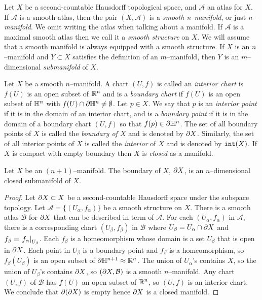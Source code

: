 \begin{defn}[Manifolds]
	\label{def:manifold}
	Let $X$ be a second-countable Hausdorff topological space, and $\mathcal{A}$ an atlas for $X$.
	If $\mathcal{A}$ is a smooth atlas, then the pair $(X,\mathcal{A})$ is a \emph{smooth n--manifold}, or just \emph{n--manifold}.
	We omit writing the atlas when talking about a manifold.
	If $\mathcal{A}$ is a maximal smooth atlas then we call it a \emph{smooth structure} on $X$.
	We will assume that a smooth manifold is always equipped with a smooth structure.
	If $X$ is an $n$--manifold and $Y\subset X$ satisfies the definition of an $m$--manifold, then $Y$ is an $m$--dimensional \emph{submanifold} of $X$.
\end{defn}

\begin{defn}	
	\label{def:boundary}
	Let $X$ be a smooth $n$--manifold.
	A chart $(U,f)$ is called an \emph{interior chart} is $f(U)$ is an open subset of $\mathbb{R}^n$ and is a \emph{boundary chart} if $f(U)$ is an open subset of $\mathbb{H}^n$ with $f(U)\cap\partial \mathbb{H}^n\neq\emptyset$.
	Let $p\in X$.
	We say that $p$ is an \emph{interior point} if it is in the domain of an interior chart, and is a \emph{boundary point} if it is in the domain of a boundary chart $(U,f)$ so that $f(p)\in\partial\mathbb{H}^n$.
	The set of all boundary points of $X$ is called the \emph{boundary of $X$} and is denoted by $\partial X$.
	Similarly, the set of all interior points of $X$ is called the \emph{interior} of $X$ and is denoted by $\mathtt{int}(X)$.
	If $X$ is compact with empty boundary then $X$ is \emph{closed} as a manifold.
\end{defn}

\begin{prop}
	\label{prop:boundariesaremanifolds}
	Let $X$ be an $(n+1)$--manifold.
	The boundary of $X$, $\partial X$, is an $n$--dimensional closed submanifold of $X$.
\end{prop}

\begin{proof}
	Let $\partial X\subset X$ be a second-countable Hausdorff space under the subspace topology.
	Let $\mathcal{A} = \{(U_\alpha, f_\alpha)\}$ be a smooth structure on $X$.
	There is a smooth atlas $\mathcal{B}$ for $\partial X$ that can be described in term of $\mathcal{A}$.
	For each $(U_\alpha,f_\alpha)$ in $\mathcal{A}$, there is a corresponding chart $(U_\beta,f_\beta)$ in $\mathcal{B}$ where $U_\beta = U_\alpha \cap \partial X$ and $f_\beta = \left.f_\alpha\right|_{U_\beta}$.
	Each $f_\beta$ is a homeomorphism whose domain is a set $U_\beta$ that is open in $\partial X$.
	Each point in $U_\beta$ is a boundary point and $f_\beta$ is a homeomorphism, so $f_\beta(U_\beta)$ is an open subset of $\partial \mathbb{H}^{n+1} \approx\mathbb{R}^n$.
	The union of $U_\alpha$'s contains $X$, so the union of $U_\beta$'s contains $\partial X$, so $(\partial X, \mathcal{B})$ is a smooth $n$--manifold.
	Any chart $(U,f)$ of $\mathcal{B}$ has $f(U)$ an open subset of $\mathbb{R}^n$, so $(U,f)$ is an interior chart.
	We conclude that $\partial(\partial X)$ is empty hence $\partial X$ is a closed manifold. 
\end{proof}

